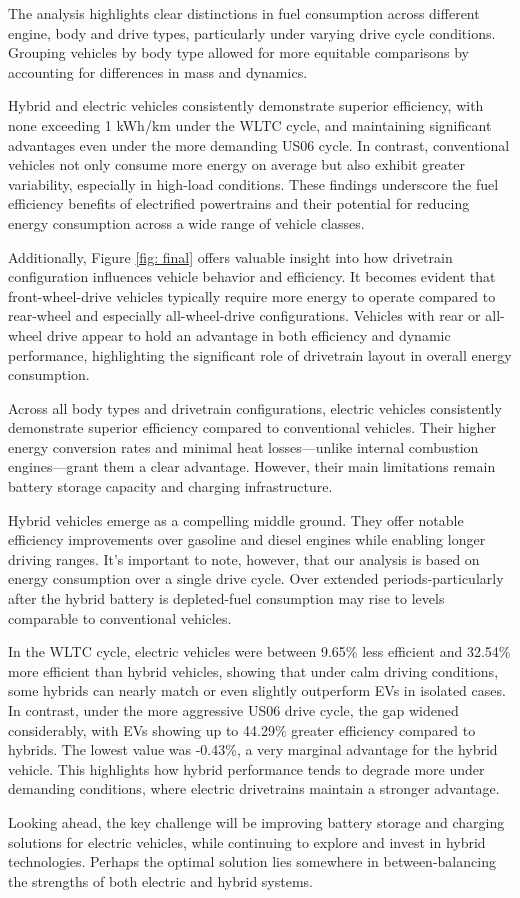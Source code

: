 The analysis highlights clear distinctions in fuel consumption across different engine, body and drive types, particularly under varying drive cycle conditions. Grouping vehicles by body type allowed for more equitable comparisons by accounting for differences in mass and dynamics.

Hybrid and electric vehicles consistently demonstrate superior efficiency, with none exceeding 1 kWh/km under the WLTC cycle, and maintaining significant advantages even under the more demanding US06 cycle. In contrast, conventional vehicles not only consume more energy on average but also exhibit greater variability, especially in high-load conditions. These findings underscore the fuel efficiency benefits of electrified powertrains and their potential for reducing energy consumption across a wide range of vehicle classes.

Additionally, Figure \ref{fig: final} offers valuable insight into how drivetrain configuration influences vehicle behavior and efficiency. It becomes evident that front-wheel-drive vehicles typically require more energy to operate compared to rear-wheel and especially all-wheel-drive configurations. Vehicles with rear or all-wheel drive appear to hold an advantage in both efficiency and dynamic performance, highlighting the significant role of drivetrain layout in overall energy consumption.

Across all body types and drivetrain configurations, electric vehicles consistently demonstrate superior efficiency compared to conventional vehicles. Their higher energy conversion rates and minimal heat losses—unlike internal combustion engines—grant them a clear advantage. However, their main limitations remain battery storage capacity and charging infrastructure.

Hybrid vehicles emerge as a compelling middle ground. They offer notable efficiency improvements over gasoline and diesel engines while enabling longer driving ranges. It’s important to note, however, that our analysis is based on energy consumption over a single drive cycle. Over extended periods-particularly after the hybrid battery is depleted-fuel consumption may rise to levels comparable to conventional vehicles.

In the WLTC cycle, electric vehicles were between 9.65\% less efficient and 32.54\% more efficient than hybrid vehicles, showing that under calm driving conditions, some hybrids can nearly match or even slightly outperform EVs in isolated cases. In contrast, under the more aggressive US06 drive cycle, the gap widened considerably, with EVs showing up to 44.29\% greater efficiency compared to hybrids. The lowest value was -0.43\%, a very marginal advantage for the hybrid vehicle. This highlights how hybrid performance tends to degrade more under demanding conditions, where electric drivetrains maintain a stronger advantage.

Looking ahead, the key challenge will be improving battery storage and charging solutions for electric vehicles, while continuing to explore and invest in hybrid technologies. Perhaps the optimal solution lies somewhere in between-balancing the strengths of both electric and hybrid systems.